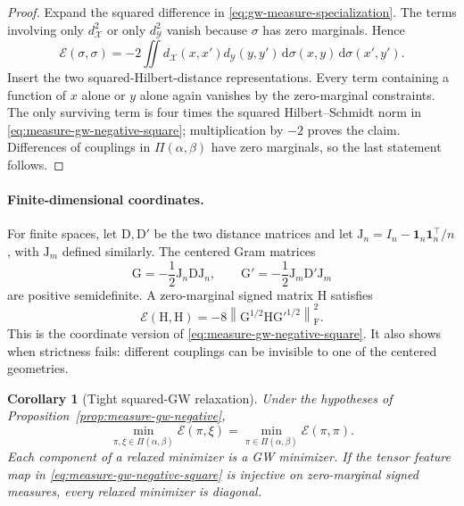 \documentclass[11pt]{article}
\newtheorem{corollary}[theorem]{Corollary}
\theoremstyle{definition}
\theoremstyle{remark}
\newcommand{\one}{\mathbf 1}
\newcommand{\Dmat}{\mathrm D}
\newcommand{\Dmatp}{\mathrm D'}
\newcommand{\Hmat}{\mathrm H}
\newcommand{\Jmat}{\mathrm J}
\newcommand{\Gmat}{\mathrm G}
\newcommand{\Gmatp}{\mathrm G'}
\newcommand{\Ee}{\mathcal E}
\newcommand{\dd}{\,\mathrm d}
\newcommand{\norm}[1]{\left\lVert #1\right\rVert}
\begin{document}
\begin{proof}
Expand the squared difference in \eqref{eq:gw-measure-specialization}.  The
terms involving only \(d_{\mathcal X}^2\) or only
\(d_{\mathcal Y}^2\) vanish because \(\sigma\) has zero marginals.  Hence
\begin{equation}\label{eq:measure-gw-cross-term}
  \Ee(\sigma,\sigma)
  =-2\iint
  d_{\mathcal X}(x,x')d_{\mathcal Y}(y,y')
  \dd\sigma(x,y)\dd\sigma(x',y').
\end{equation}
Insert the two squared-Hilbert-distance representations.  Every term
containing a function of \(x\) alone or \(y\) alone again vanishes by the
zero-marginal constraints.  The only surviving term is four times the squared
Hilbert--Schmidt norm in \eqref{eq:measure-gw-negative-square}; multiplication
by \(-2\) proves the claim.  Differences of couplings in
\(\Pi(\alpha,\beta)\) have zero marginals, so the last statement follows.
\end{proof}

\paragraph{Finite-dimensional coordinates.}
For finite spaces, let \(\Dmat,\Dmatp\) be the two distance matrices and let
\(
 \Jmat_n=I_n-\one_n\one_n^\top/n
\), with \(\Jmat_m\) defined similarly.  The centered Gram matrices
\begin{equation}\label{eq:discrete-centered-gram}
  \Gmat=-\frac12\Jmat_n\Dmat\Jmat_n,
  \qquad
  \Gmatp=-\frac12\Jmat_m\Dmatp\Jmat_m
\end{equation}
are positive semidefinite.  A zero-marginal signed matrix \(\Hmat\) satisfies
\begin{equation}\label{eq:discrete-gw-negative-square}
  \Ee(\Hmat,\Hmat)
  =-8\norm{\Gmat^{1/2}\Hmat\Gmatp^{1/2}}_{\mathrm F}^2.
\end{equation}
This is the coordinate version of
\eqref{eq:measure-gw-negative-square}.  It also shows when strictness fails:
different couplings can be invisible to one of the centered geometries.

\begin{corollary}[Tight squared-GW relaxation]
\label{cor:gw-tightness}
Under the hypotheses of Proposition~\ref{prop:measure-gw-negative},
\begin{equation}\label{eq:continuous-gw-tightness}
  \min_{\pi,\xi\in\Pi(\alpha,\beta)}\Ee(\pi,\xi)
  =
  \min_{\pi\in\Pi(\alpha,\beta)}\Ee(\pi,\pi).
\end{equation}
Each component of a relaxed minimizer is a GW minimizer.  If the tensor
feature map in \eqref{eq:measure-gw-negative-square} is injective on
zero-marginal signed measures, every relaxed minimizer is diagonal.
\end{corollary}
\end{document}
